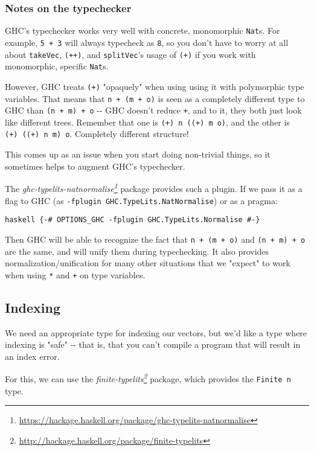 \documentclass[]{article}
\renewcommand{\href}[2]{#2\footnote{\url{#1}}}
\begin{document}
\subsubsection{Notes on the typechecker}

GHC's typechecker works very well with concrete, monomorphic \texttt{Nat}s. For
example, \texttt{5\ +\ 3} will always typecheck as \texttt{8}, so you don't have
to worry at all about \texttt{takeVec}, \texttt{(++)}, and \texttt{splitVec}'s
usage of \texttt{(+)} if you work with monomorphic, specific \texttt{Nat}s.

However, GHC treats \texttt{(+)} "opaquely" when using using it with polymorphic
type variables. That means that \texttt{n\ +\ (m\ +\ o)} is seen as a completely
different type to GHC than \texttt{(n\ +\ m)\ +\ o} -\/- GHC doesn't reduce
\texttt{+}, and to it, they both just look like different trees. Remember that
one is \texttt{(+)\ n\ ((+)\ m\ o)}, and the other is
\texttt{(+)\ ((+)\ n\ m)\ o}. Completely different structure!

This comes up as an issue when you start doing non-trivial things, so it
sometimes helps to augment GHC's typechecker.

The
\emph{\href{https://hackage.haskell.org/package/ghc-typelits-natnormalise}{ghc-typelits-natnormalise}}
package provides such a plugin. If we pass it as a flag to GHC (as
\texttt{-fplugin\ GHC.TypeLits.NatNormalise}) or as a pragma:

\texttt{haskell\ \{-\#\ OPTIONS\_GHC\ -fplugin\ GHC.TypeLits.Normalise\ \#-\}}

Then GHC will be able to recognize the fact that \texttt{n\ +\ (m\ +\ o)} and
\texttt{(n\ +\ m)\ +\ o} are the same, and will unify them during typechecking.
It also provides normalization/unification for many other situations that we
"expect" to work when using \texttt{*} and \texttt{+} on type variables.

\subsection{Indexing}

We need an appropriate type for indexing our vectors, but we'd like a type where
indexing is "safe" -\/- that is, that you can't compile a program that will
result in an index error.

For this, we can use the
\emph{\href{http://hackage.haskell.org/package/finite-typelits}{finite-typelits}}
package, which provides the \texttt{Finite\ n} type.
\end{document}
